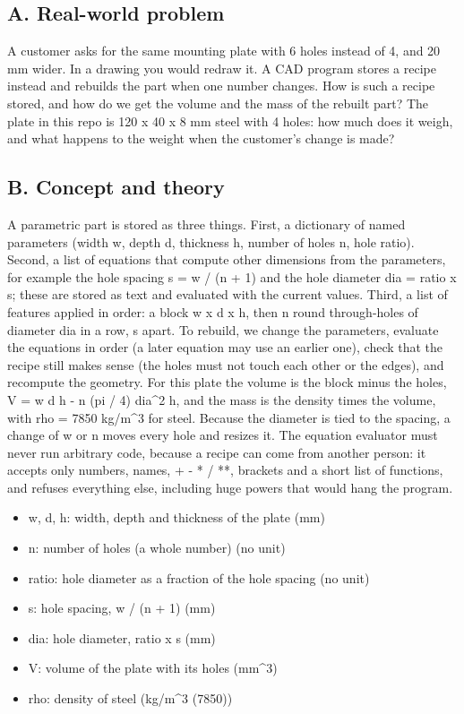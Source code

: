 \documentclass[11pt,a4paper]{article}
\begin{document}
\subsection*{A. Real-world problem}
A customer asks for the same mounting plate with 6 holes instead of 4, and 20 mm wider. In a drawing you would redraw it. A CAD program stores a recipe instead and rebuilds the part when one number changes. How is such a recipe stored, and how do we get the volume and the mass of the rebuilt part? The plate in this repo is 120 x 40 x 8 mm steel with 4 holes: how much does it weigh, and what happens to the weight when the customer's change is made?

\subsection*{B. Concept and theory}
A parametric part is stored as three things. First, a dictionary of named parameters (width w, depth d, thickness h, number of holes n, hole ratio). Second, a list of equations that compute other dimensions from the parameters, for example the hole spacing s = w / (n + 1) and the hole diameter dia = ratio x s; these are stored as text and evaluated with the current values. Third, a list of features applied in order: a block w x d x h, then n round through-holes of diameter dia in a row, s apart. To rebuild, we change the parameters, evaluate the equations in order (a later equation may use an earlier one), check that the recipe still makes sense (the holes must not touch each other or the edges), and recompute the geometry. For this plate the volume is the block minus the holes, V = w d h - n (pi / 4) dia\textasciicircum{}2 h, and the mass is the density times the volume, with rho = 7850 kg/m\textasciicircum{}3 for steel. Because the diameter is tied to the spacing, a change of w or n moves every hole and resizes it. The equation evaluator must never run arbitrary code, because a recipe can come from another person: it accepts only numbers, names, + - * / **, brackets and a short list of functions, and refuses everything else, including huge powers that would hang the program.

\begin{itemize}[nosep]
\item w, d, h: width, depth and thickness of the plate (mm)
\item n: number of holes (a whole number) (no unit)
\item ratio: hole diameter as a fraction of the hole spacing (no unit)
\item s: hole spacing, w / (n + 1) (mm)
\item dia: hole diameter, ratio x s (mm)
\item V: volume of the plate with its holes (mm\textasciicircum{}3)
\item rho: density of steel (kg/m\textasciicircum{}3 (7850))
\end{itemize}
\end{document}
